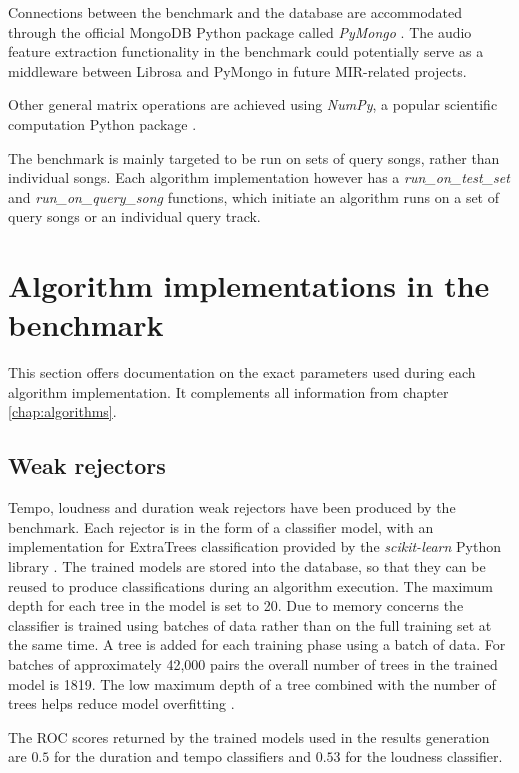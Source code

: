 Connections between the benchmark and the database are accommodated
through the official MongoDB Python package called \textit{PyMongo}
\cite{pymongo}. The audio feature extraction functionality in the benchmark
could potentially serve as a middleware between Librosa and PyMongo in future
MIR-related projects.

Other general matrix operations are achieved using \textit{NumPy}, a popular
scientific computation Python package \cite{numpy}.

The benchmark is mainly targeted to be run on sets of query songs, rather than
individual songs. Each algorithm implementation however has a
\textit{run\_on\_test\_set} and \textit{run\_on\_query\_song} functions, which
initiate an algorithm runs on a set of query songs or an individual query track.

\section{Algorithm implementations in the benchmark} 
\label{sec:algostructure}
This section offers documentation on the exact parameters used during each
algorithm implementation. It complements all information from chapter
\ref{chap:algorithms}. 
\subsection{Weak rejectors}
\label{subsec:weakrejectorimplementation}
Tempo, loudness and duration weak rejectors have been produced by the benchmark.
Each rejector is in the form of a classifier model, with an implementation for
ExtraTrees classification provided by the \textit{scikit-learn} Python library
\cite{scikit-learn}. The trained models are stored into the database, so that
they can be reused to produce classifications during an algorithm execution. The
maximum depth for each tree in the model is set to 20. Due to memory concerns
the classifier is trained using batches of data rather than on the full training
set at the same time. A tree is added for each training phase using a batch of
data. For batches of approximately 42,000 pairs the overall number of trees in
the trained model is 1819. The low maximum depth of a tree combined with the
number of trees helps reduce model overfitting \cite{osmalsky2016enhancing}.

The ROC scores returned by the trained models used in the results generation are
$0.5$ for the duration and tempo classifiers and $0.53$ for the loudness
classifier.

